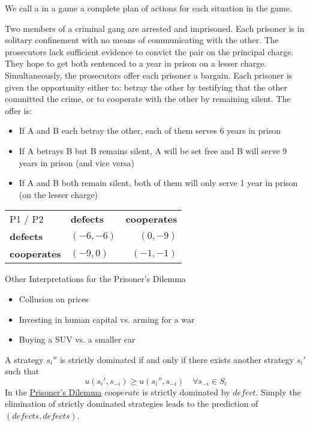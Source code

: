 We call a  in a game a complete plan of actions for each situation in the game.

\begin{example} \label{prisonersdilemma}
Two members of a criminal gang are arrested and imprisoned. Each prisoner is in solitary confinement with no means of communicating with the other. The prosecutors lack sufficient evidence to convict the pair on the principal charge. They hope to get both sentenced to a year in prison on a lesser charge. Simultaneously, the prosecutors offer each prisoner a bargain. Each prisoner is given the opportunity either to: betray the other by testifying that the other committed the crime, or to cooperate with the other by remaining silent. The offer is:
	\begin{itemize}
		\item If A and B each betray the other, each of them serves 6 years in prison
		\item If A betrays B but B remains silent, A will be set free and B will serve 9 years in prison (and vice versa)
		\item If A and B both remain silent, both of them will only serve 1 year in prison (on the lesser charge)
	\end{itemize}
	
\begin{center}
	\begin{tabular}{|l|l|r|}
		\hline\hline
  			P1 / P2 & \textbf{defects} & \textbf{cooperates} \\
         		\cline{1-3}
   			\textbf{defects} & $(-6, -6)$ & $(0, -9)$ 	\arrayrulewidth2pt \\
            	\cline{1-3}
   			\textbf{cooperates} & $(-9, 0)$ & $(-1, -1)$ \\ \hline\hline
	\end{tabular}	
\end{center}


	Other Interpretations for the Prisoner's Dilemma
	\begin{itemize}
		\item Collusion on prices
		\item Investing in human capital vs. arming for a war
		\item Buying a SUV vs. a smaller car
	\end{itemize}
\end{example}

\begin{definition*}
	A strategy $s_{i}''$ is strictly dominated if and only if there exists another strategy $s_{i}'$ such that
	\[ u(s_{i}', s_{-i}) \geq u(s_{i}'', s_{-i}) \quad \forall s_{-i} \in S_{i} \]	
	In the \hyperref[prisonersdilemma]{Prisoner's Dilemma} $cooperate$ is strictly dominated by $defect$. Simply the elimination of strictly dominated strategies leads to the prediction of $(defects, defects)$.
\end{definition*}

